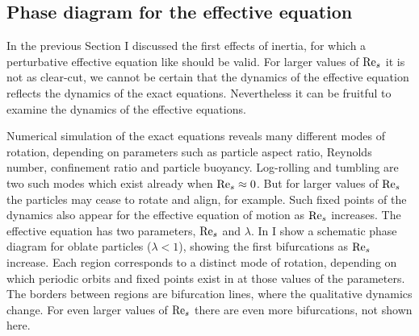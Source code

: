 \documentclass[thesis.tex]{subfiles}
\begin{document}
\subsection*{Phase diagram for the effective equation}
In the previous Section I discussed the first effects of inertia, for which a perturbative effective equation like  should be valid. For larger values of $\textrm{Re}_s$ it is not as clear-cut, we cannot be certain that the dynamics of the effective equation reflects the dynamics of the exact equations. Nevertheless it can be fruitful to examine the dynamics of the effective equations.

Numerical simulation of the exact equations reveals many different modes of rotation, depending on parameters such as particle aspect ratio, Reynolds number, confinement ratio and particle buoyancy. Log-rolling and tumbling are two such modes which exist already when $\textrm{Re}_s\approx0$. But for larger values of $\textrm{Re}_s$ the particles may cease to rotate and align, for example. Such fixed points of the dynamics also appear for the effective equation of motion  as $\textrm{Re}_s$ increases. The effective equation has two parameters, $\textrm{Re}_s$ and $\lambda$. In  I show a schematic phase diagram for oblate particles ($\lambda<1$), showing the first bifurcations as $\textrm{Re}_s$ increase. Each region corresponds to a distinct mode of rotation, depending on which periodic orbits and fixed points exist in  at those values of the parameters. The borders between regions are bifurcation lines, where the qualitative dynamics change. For even larger values of $\textrm{Re}_s$ there are even more bifurcations, not shown here.
\end{document}
